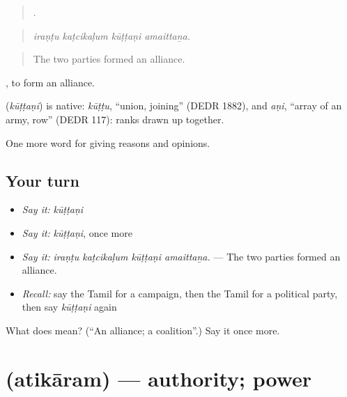 \begin{quote}
   .
\end{quote}

\begin{quote}
\emph{iraṇṭu kaṭcikaḷum kūṭṭaṇi amaittaṉa.}
\end{quote}

\begin{quote}
The two parties formed an alliance.
\end{quote}

 , to form an alliance.

\begin{cousinweb}
\textbf{} (\emph{kūṭṭaṇi}) is native: \emph{kūṭṭu}, \textquotedblleft{}union, joining\textquotedblright{} (DEDR 1882), and \emph{aṇi}, \textquotedblleft{}array of an army, row\textquotedblright{} (DEDR 117): ranks drawn up together.
\end{cousinweb}

\begin{grammarlens}[title={What you've built}]
One more word for giving reasons and opinions.
\end{grammarlens}

\subsection*{Your turn}
\begin{itemize}
\raggedright
  \item \emph{Say it:} \emph{kūṭṭaṇi}
  \item \emph{Say it:} \emph{kūṭṭaṇi}, once more
  \item \emph{Say it:} \emph{iraṇṭu kaṭcikaḷum kūṭṭaṇi amaittaṉa.} — The two parties formed an alliance.
  \item \emph{Recall:} say the Tamil for a campaign, then the Tamil for a political party, then say \emph{kūṭṭaṇi} again
\end{itemize}

\begin{tcolorbox}[breakable,colback=teal!4,colframe=teal!35!black,title={Before you move on}]
What does  mean? (\textquotedblleft{}An alliance; a coalition\textquotedblright{}.) Say it once more.
\end{tcolorbox}
\section[\texorpdfstring{\ta{அதிகாரம்} (atikāram)}{அதிகாரம் (atikāram)}]{ (atikāram) — authority; power}

